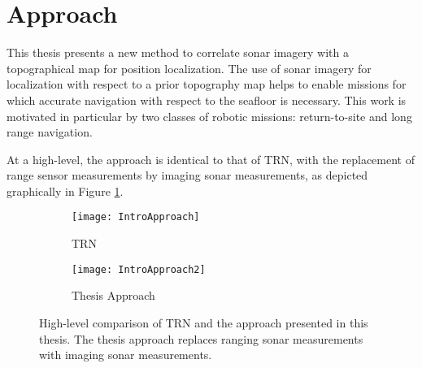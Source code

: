 %

\section{Approach}
\label{intro.Approach}

This thesis presents a new method to correlate sonar imagery with a topographical map for position localization. 
The use of sonar imagery for localization with respect to a prior topography map helps to enable missions for which accurate navigation with respect to the seafloor is necessary.  
This work is motivated in particular by two classes of robotic missions: return-to-site and long range navigation.

At a high-level, the approach is identical to that of TRN, with the replacement of range sensor measurements by imaging sonar measurements, as depicted graphically in Figure \ref{fig:approach}. 

\begin{figure}[!h]
	\centering
	\begin{subfigure}[b]{0.48\textwidth}
                \texttt{[image: IntroApproach]}
                \caption{TRN}
  	\end{subfigure}
  	\hspace{2ex}
  	\centering
	\begin{subfigure}[b]{0.48\textwidth}
                \texttt{[image: IntroApproach2]}
                \caption{Thesis Approach}
  	\end{subfigure}
	\caption{High-level comparison of TRN and the approach presented in this thesis. The thesis approach replaces ranging sonar measurements with imaging sonar measurements. }	
	\label{fig:approach}
\end{figure}

